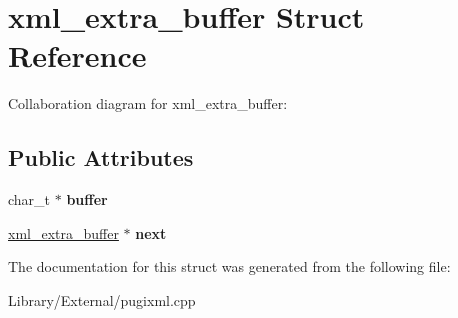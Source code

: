 \hypertarget{structxml__extra__buffer}{}\section{xml\+\_\+extra\+\_\+buffer Struct Reference}
\label{structxml__extra__buffer}


Collaboration diagram for xml\+\_\+extra\+\_\+buffer\+:
\subsection*{Public Attributes}
\begin{DoxyCompactItemize}
\item 
\hypertarget{structxml__extra__buffer_ab24b191b25f92ad4d48009978ebee38c}{}char\+\_\+t $\ast$ {\bfseries buffer}\label{structxml__extra__buffer_ab24b191b25f92ad4d48009978ebee38c}

\item 
\hypertarget{structxml__extra__buffer_a8aaafa90868ca4d8e06b21eeabd96183}{}\hyperlink{structxml__extra__buffer}{xml\+\_\+extra\+\_\+buffer} $\ast$ {\bfseries next}\label{structxml__extra__buffer_a8aaafa90868ca4d8e06b21eeabd96183}

\end{DoxyCompactItemize}


The documentation for this struct was generated from the following file\+:\begin{DoxyCompactItemize}
\item 
Library/\+External/pugixml.\+cpp\end{DoxyCompactItemize}
